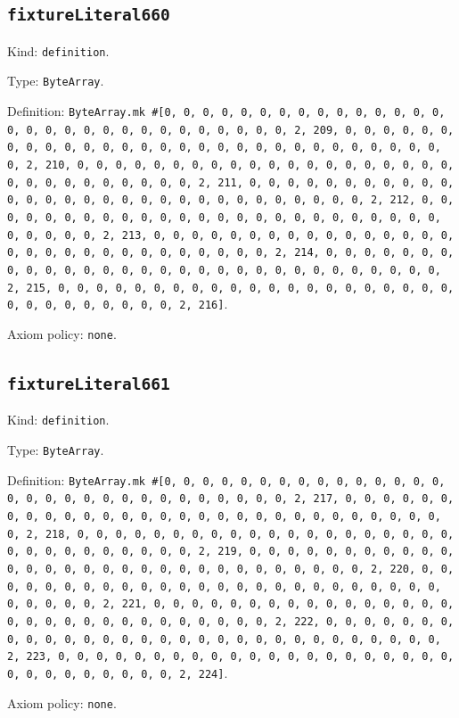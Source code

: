 \documentclass[11pt]{article}
\begin{document}
\subsection*{\texttt{fixtureLiteral660}}
\noindent Kind: \texttt{definition}.\par
\noindent Type: \texttt{ByteArray}.\par
\noindent Definition: \texttt{ByteArray.mk \#[0, 0, 0, 0, 0, 0, 0, 0, 0, 0, 0, 0, 0, 0, 0, 0, 0, 0, 0, 0, 0, 0, 0, 0, 0, 0, 0, 0, 0, 0, 2, 209, 0, 0, 0, 0, 0, 0, 0, 0, 0, 0, 0, 0, 0, 0, 0, 0, 0, 0, 0, 0, 0, 0, 0, 0, 0, 0, 0, 0, 0, 0, 2, 210, 0, 0, 0, 0, 0, 0, 0, 0, 0, 0, 0, 0, 0, 0, 0, 0, 0, 0, 0, 0, 0, 0, 0, 0, 0, 0, 0, 0, 0, 0, 2, 211, 0, 0, 0, 0, 0, 0, 0, 0, 0, 0, 0, 0, 0, 0, 0, 0, 0, 0, 0, 0, 0, 0, 0, 0, 0, 0, 0, 0, 0, 0, 2, 212, 0, 0, 0, 0, 0, 0, 0, 0, 0, 0, 0, 0, 0, 0, 0, 0, 0, 0, 0, 0, 0, 0, 0, 0, 0, 0, 0, 0, 0, 0, 2, 213, 0, 0, 0, 0, 0, 0, 0, 0, 0, 0, 0, 0, 0, 0, 0, 0, 0, 0, 0, 0, 0, 0, 0, 0, 0, 0, 0, 0, 0, 0, 2, 214, 0, 0, 0, 0, 0, 0, 0, 0, 0, 0, 0, 0, 0, 0, 0, 0, 0, 0, 0, 0, 0, 0, 0, 0, 0, 0, 0, 0, 0, 0, 2, 215, 0, 0, 0, 0, 0, 0, 0, 0, 0, 0, 0, 0, 0, 0, 0, 0, 0, 0, 0, 0, 0, 0, 0, 0, 0, 0, 0, 0, 0, 0, 2, 216]}.\par
\noindent Axiom policy: \texttt{none}.\par
\subsection*{\texttt{fixtureLiteral661}}
\noindent Kind: \texttt{definition}.\par
\noindent Type: \texttt{ByteArray}.\par
\noindent Definition: \texttt{ByteArray.mk \#[0, 0, 0, 0, 0, 0, 0, 0, 0, 0, 0, 0, 0, 0, 0, 0, 0, 0, 0, 0, 0, 0, 0, 0, 0, 0, 0, 0, 0, 0, 2, 217, 0, 0, 0, 0, 0, 0, 0, 0, 0, 0, 0, 0, 0, 0, 0, 0, 0, 0, 0, 0, 0, 0, 0, 0, 0, 0, 0, 0, 0, 0, 2, 218, 0, 0, 0, 0, 0, 0, 0, 0, 0, 0, 0, 0, 0, 0, 0, 0, 0, 0, 0, 0, 0, 0, 0, 0, 0, 0, 0, 0, 0, 0, 2, 219, 0, 0, 0, 0, 0, 0, 0, 0, 0, 0, 0, 0, 0, 0, 0, 0, 0, 0, 0, 0, 0, 0, 0, 0, 0, 0, 0, 0, 0, 0, 2, 220, 0, 0, 0, 0, 0, 0, 0, 0, 0, 0, 0, 0, 0, 0, 0, 0, 0, 0, 0, 0, 0, 0, 0, 0, 0, 0, 0, 0, 0, 0, 2, 221, 0, 0, 0, 0, 0, 0, 0, 0, 0, 0, 0, 0, 0, 0, 0, 0, 0, 0, 0, 0, 0, 0, 0, 0, 0, 0, 0, 0, 0, 0, 2, 222, 0, 0, 0, 0, 0, 0, 0, 0, 0, 0, 0, 0, 0, 0, 0, 0, 0, 0, 0, 0, 0, 0, 0, 0, 0, 0, 0, 0, 0, 0, 2, 223, 0, 0, 0, 0, 0, 0, 0, 0, 0, 0, 0, 0, 0, 0, 0, 0, 0, 0, 0, 0, 0, 0, 0, 0, 0, 0, 0, 0, 0, 0, 2, 224]}.\par
\noindent Axiom policy: \texttt{none}.\par
\end{document}
